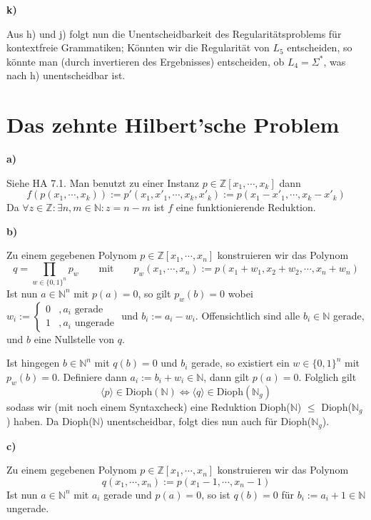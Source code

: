 \documentclass[a4paper,graphics,11pt]{article}
\newcommand{\godel}[1]{\langle #1 \rangle}
\begin{document}
\strut

\textbf{k)}

Aus h) und j) folgt nun die Unentscheidbarkeit des Regularitätsproblems für kontextfreie Grammatiken;
Könnten wir die Regularität von $L_5$ entscheiden, so könnte man (durch invertieren des Ergebnisses)
entscheiden, ob $L_4 = \Sigma^*$, was nach h) unentscheidbar ist.



\newpage



\section{Das zehnte Hilbert'sche Problem}

\textbf{a)}

Siehe HA 7.1. Man benutzt zu einer Instanz $p \in \mathbb{Z}[x_1,\cdots,x_k]$ dann
$$
    f(p(x_1,\cdots,x_k))
    := p'(x_1,x'_1,\cdots,x_k,x'_k)
    := p(x_1 - x'_1, \cdots, x_k - x'_k)
$$
Da $\forall z \in \mathbb{Z}: \exists n,m \in \mathbb{N} : z = n-m$ ist $f$ eine funktionierende Reduktion.

\strut

\textbf{b)}

Zu einem gegebenen Polynom $p \in \mathbb{Z}[x_1,\cdots,x_n]$ konstruieren wir das Polynom
$$
    q = \prod_{w \in \{0,1\}^n} p_w
    \qquad\text{mit}\qquad
    p_w(x_1,\cdots,x_n) := p(x_1+w_1, x_2+w_2, \cdots, x_n+w_n)
$$
Ist nun $a \in \mathbb{N}^n$ mit $p(a) = 0$, so gilt $p_w(b) = 0$ wobei $w_i := \begin{cases}0 &, a_i\text{ gerade}\\
1 &, a_i \text{ ungerade}\end{cases}$ und $b_i := a_i - w_i$. Offensichtlich sind alle $b_i \in \mathbb{N}$
gerade, und $b$ eine Nullstelle von $q$.

Ist hingegen $b \in \mathbb{N}^n$ mit $q(b) = 0$ und $b_i$ gerade, so existiert ein $w \in \{0,1\}^n$ mit $p_w(b) = 0$.
Definiere dann $a_i := b_i + w_i \in \mathbb{N}$, dann gilt $p(a) = 0$. Folglich gilt
$$
    \godel{p} \in \text{Dioph}(\mathbb{N}) \iff \godel{q} \in \text{Dioph}(\mathbb{N}_g)
$$
sodass wir (mit noch einem Syntaxcheck) eine Reduktion Dioph($\mathbb{N}$) $\leq$ Dioph($\mathbb{N}_g$) haben.
Da Dioph($\mathbb{N}$) unentscheidbar, folgt dies nun auch für Dioph($\mathbb{N}_g$).

\strut

\textbf{c)}

Zu einem gegebenen Polynom $p \in \mathbb{Z}[x_1,\cdots,x_n]$ konstruieren wir das Polynom
$$
    q(x_1,\cdots,x_n) := p(x_1 - 1,\cdots,x_n-1)
$$
Ist nun $a \in \mathbb{N}^n$ mit $a_i$ gerade und $p(a) = 0$, so ist $q(b) = 0$ für $b_i := a_i+1 \in \mathbb{N}$ ungerade.
\end{document}
